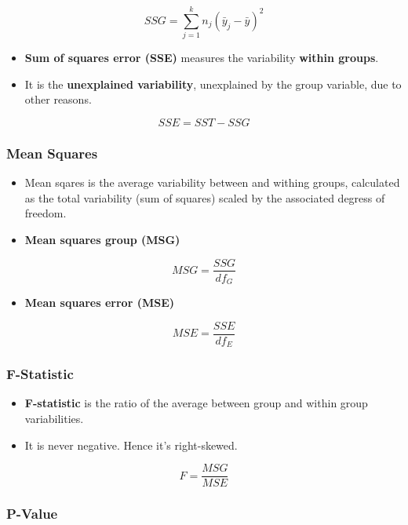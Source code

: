 \documentclass[]{book}
\providecommand{\tightlist}{%
  \setlength{\itemsep}{0pt}\setlength{\parskip}{0pt}}
\begin{document}
\[
SSG = \sum^k_{j=1} n_j (\bar{y}_j - \bar{y})^2
\]

\begin{itemize}
\tightlist
\item
  \textbf{Sum of squares error (SSE)} measures the variability \textbf{within groups}.
\item
  It is the \textbf{unexplained variability}, unexplained by the group variable, due to other reasons.
\end{itemize}

\[
SSE = SST - SSG
\]

\hypertarget{mean-squares}{%
\subsubsection*{Mean Squares}\label{mean-squares}}

\begin{itemize}
\item
  Mean sqares is the average variability between and withing groups, calculated as the total variability (sum of squares) scaled by the associated degress of freedom.
\item
  \textbf{Mean squares group (MSG)}
\end{itemize}

\[
MSG = \frac{SSG}{df_G}
\]

\begin{itemize}
\tightlist
\item
  \textbf{Mean squares error (MSE)}
\end{itemize}

\[
MSE = \frac{SSE}{df_E}
\]

\hypertarget{f-statistic}{%
\subsubsection*{F-Statistic}\label{f-statistic}}

\begin{itemize}
\tightlist
\item
  \textbf{F-statistic} is the ratio of the average between group and within
  group variabilities.
\item
  It is never negative. Hence it's right-skewed.
\end{itemize}

\[
F = \frac{MSG}{MSE}
\]

\hypertarget{p-value-1}{%
\subsubsection*{P-Value}\label{p-value-1}}
\end{document}
